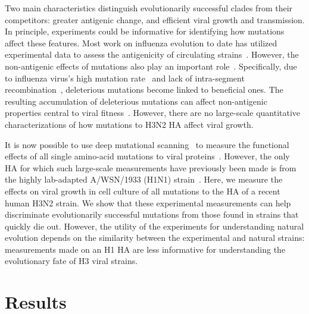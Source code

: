 Two main characteristics distinguish evolutionarily successful clades from their competitors: greater antigenic change, and efficient viral growth and transmission.
In principle, experiments could be informative for identifying how mutations affect these features.
Most work on influenza evolution to date has utilized experimental data to assess the antigenicity of circulating strains~\citep{sun2013using,harvey2016identification,Neher:2016hy,Koel:2013jz,Chambers:2015jt,li2016selection}.
However, the non-antigenic effects of mutations also play an important role~\citep{pybus2007phylogenetic,strelkowa2012clonal,Luksza:2014hj,Koelle:2015dh}.
Specifically, due to influenza virus's high mutation rate~\citep{holland1982rapid,steinhauer1987rapid,lauring2010quasispecies} and lack of intra-segment recombination~\citep{boni2008homologous}, deleterious mutations become linked to beneficial ones.
The resulting accumulation of deleterious mutations can affect non-antigenic properties central to viral fitness~\citep{Luksza:2014hj}.
However, there are no large-scale quantitative characterizations of how mutations to H3N2 HA affect viral growth.

It is now possible to use deep mutational scanning~\citep{fowler2014deep} to measure the functional effects of all single amino-acid mutations to viral proteins~\citep{Thyagarajan:2014go,Wu:2014ii,Doud:2016gm,haddox2016experimental,qi2015high,haddox2018mapping}.
However, the only HA for which such large-scale measurements have previously been made is from the highly lab-adapted A/WSN/1933 (H1N1) strain~\citep{Thyagarajan:2014go,Wu:2014ii,Doud:2016gm}.
Here, we measure the effects on viral growth in cell culture of all mutations to the HA of a recent human H3N2 strain.
We show that these experimental measurements can help discriminate evolutionarily successful mutations from those found in strains that quickly die out.
However, the utility of the experiments for understanding natural evolution depends on the similarity between the experimental and natural strains: measurements made on an H1 HA are less informative for understanding the evolutionary fate of H3 viral strains.

\section{Results}

